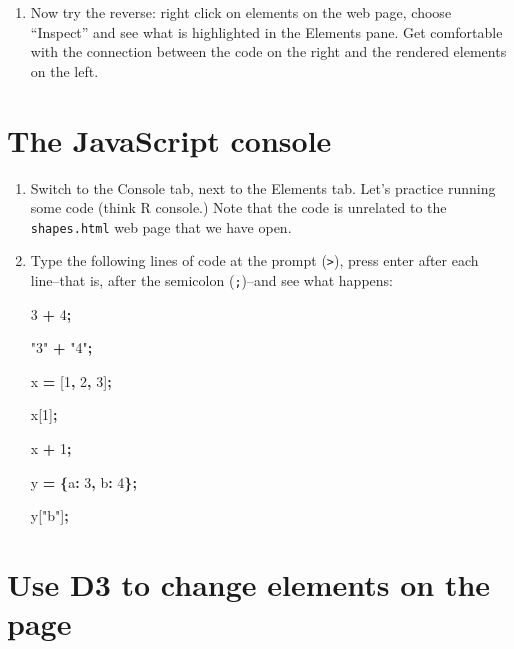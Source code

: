 \documentclass[]{book}
\newenvironment{Shaded}{\begin{snugshade}}{\end{snugshade}}
\newcommand{\DataTypeTok}[1]{\textcolor[rgb]{0.13,0.29,0.53}{#1}}
\newcommand{\DecValTok}[1]{\textcolor[rgb]{0.00,0.00,0.81}{#1}}
\newcommand{\NormalTok}[1]{#1}
\newcommand{\OperatorTok}[1]{\textcolor[rgb]{0.81,0.36,0.00}{\textbf{#1}}}
\newcommand{\StringTok}[1]{\textcolor[rgb]{0.31,0.60,0.02}{#1}}
\providecommand{\tightlist}{%
  \setlength{\itemsep}{0pt}\setlength{\parskip}{0pt}}
\begin{document}
\begin{enumerate}
\def\labelenumi{\arabic{enumi}.}
\setcounter{enumi}{4}
\tightlist
\item
  Now try the reverse: right click on elements on the web page, choose ``Inspect'' and see what is highlighted in the Elements pane. Get comfortable with the connection between the code on the right and the rendered elements on the left.
\end{enumerate}

\hypertarget{the-javascript-console}{%
\section{The JavaScript console}\label{the-javascript-console}}

\begin{enumerate}
\def\labelenumi{\arabic{enumi}.}
\item
  Switch to the Console tab, next to the Elements tab. Let's practice running some code (think R console.) Note that the code is unrelated to the \texttt{shapes.html} web page that we have open.
\item
  Type the following lines of code at the prompt (\texttt{\textgreater{}}), press enter after each line--that is, after the semicolon (\texttt{;})--and see what happens:

\begin{Shaded}
\begin{Highlighting}[]
\DecValTok{3} \OperatorTok{+} \DecValTok{4}\OperatorTok{;}

\StringTok{"3"} \OperatorTok{+} \StringTok{"4"}\OperatorTok{;}

\NormalTok{x }\OperatorTok{=}\NormalTok{ [}\DecValTok{1}\OperatorTok{,} \DecValTok{2}\OperatorTok{,} \DecValTok{3}\NormalTok{]}\OperatorTok{;}

\NormalTok{x[}\DecValTok{1}\NormalTok{]}\OperatorTok{;}

\NormalTok{x }\OperatorTok{+} \DecValTok{1}\OperatorTok{;}

\NormalTok{y }\OperatorTok{=} \OperatorTok{\{}\DataTypeTok{a}\OperatorTok{:} \DecValTok{3}\OperatorTok{,} \DataTypeTok{b}\OperatorTok{:} \DecValTok{4}\OperatorTok{\};}

\NormalTok{y[}\StringTok{"b"}\NormalTok{]}\OperatorTok{;}
\end{Highlighting}
\end{Shaded}
\end{enumerate}

\hypertarget{use-d3-to-change-elements-on-the-page}{%
\section{Use D3 to change elements on the page}\label{use-d3-to-change-elements-on-the-page}}
\end{document}
